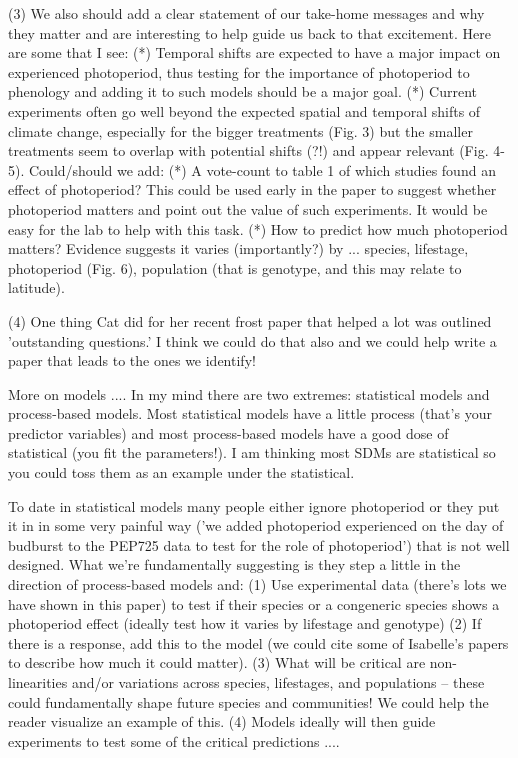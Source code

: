 \documentclass{article}
\begin{document}
(3) We also should add a clear statement of our take-home messages and why they matter and are interesting to help guide us back to that excitement. Here are some that I see:
(*) Temporal shifts are expected to have a major impact on experienced photoperiod, thus testing for the importance of photoperiod to phenology and adding it to such models should be a major goal.
(*) Current experiments often go well beyond the expected spatial and temporal shifts of climate change, especially for the bigger treatments (Fig. 3) but  the smaller treatments seem to overlap with potential shifts (?!) and appear relevant (Fig. 4-5). 
Could/should we add: 
(*) A vote-count to table 1 of which studies found an effect of photoperiod? This could be used early in the paper to suggest whether photoperiod matters and point out the value of such experiments. It would be easy for the lab to help with this task. 
(*) How to predict how much photoperiod matters? Evidence suggests it varies (importantly?) by ... species, lifestage, photoperiod (Fig. 6), population (that is genotype, and this may relate to latitude). 

(4) One thing Cat did for her recent frost paper that helped a lot was outlined 'outstanding questions.' I think we could do that also and we could help write a paper that leads to the ones we identify!

More on models ....
In my mind there are two extremes: statistical models and process-based models. Most statistical models have a little process (that's your predictor variables) and most process-based models have a good dose of statistical (you fit the parameters!). I am thinking most SDMs are statistical so you could toss them as an example under the statistical.

To date in statistical models many people either ignore photoperiod or they put it in in some very painful way ('we added photoperiod experienced on the day of budburst to the PEP725 data to test for the role of photoperiod') that is not well designed. What we're fundamentally suggesting is they step a little in the direction of process-based models and:
(1) Use experimental data (there's lots we have shown in this paper) to test if their species or a congeneric species shows a photoperiod effect (ideally test how it varies by lifestage and genotype)
(2) If there is a response, add this to the model (we could cite some of Isabelle's papers to describe how much it could matter).
(3) What will be critical are non-linearities and/or variations across species, lifestages, and populations -- these could fundamentally shape future species and communities! We could help the reader visualize an example of this.
(4) Models ideally will then guide experiments to test some of the critical predictions ....
	
\end{document}
